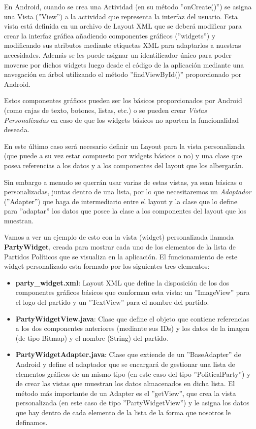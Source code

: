 		En Android, cuando se crea una Actividad (en su método ''onCreate()'') se asigna una Vista (''View'') a la actividad que representa la interfaz del usuario. Esta vista está definida en un archivo de Layout XML que se deberá modificar para crear la interfaz gráfica añadiendo componentes gráficos \cite{ref:android_widget} (''widgets'') y modificando sus atributos mediante etiquetas XML para adaptarlos a nuestras necesidades. Además se les puede asignar un identificador único para poder moverse por dichos widgets luego desde el código de la aplicación mediante una navegación en árbol utilizando el método ''findViewById()'' proporcionado por Android. 
		
		Estos componentes gráficos pueden ser los básicos proporcionados por Android (como cajas de texto, botones, listas, etc.) o se pueden crear \textit{Vistas Personalizadas} en caso de que los widgets básicos no aporten la funcionalidad deseada.
		
		En este último caso será necesario definir un Layout para la vista personalizada (que puede a su vez estar compuesto por widgets básicos o no) y una clase que posea referencias a los datos y a los componentes del layout que los albergarán.
		
		Sin embargo a menudo se querrán usar varias de estas vistas, ya sean básicas o personalizadas, juntas dentro de una lista,  por lo que necesitaremos un \textit{Adaptador}\cite{ref:android_adapter} (''Adapter'') que haga de intermediario entre el layout y la clase que lo define para ''adaptar'' los datos que posee la clase a los componentes del layout que los muestran. 
		
		Vamos a ver un ejemplo de esto con la vista (widget) personalizada llamada \textbf{PartyWidget}, creada para mostrar cada uno de los elementos de la lista de Partidos Políticos que se visualiza en la aplicación. El funcionamiento de este widget personalizado esta formado por los siguientes tres elementos:
		
		\begin{itemize}
			\item \textbf{party\_widget.xml}: Layout XML que define la disposición de los dos componentes gráficos básicos que conforman esta vista: un ''ImageView'' para el logo del partido y un ''TextView'' para el nombre del partido.
			\item \textbf{PartyWidgetView.java}: Clase que define el objeto que contiene referencias a los dos componentes anteriores (mediante sus IDs) y los datos de la imagen (de tipo Bitmap) y el nombre (String) del partido.
			\item \textbf{PartyWidgetAdapter.java}: Clase que extiende de un ''BaseAdapter'' de Android y define el adaptador que se encargará de gestionar una lista de elementos gráficos de un mismo tipo (en este caso del tipo ''PoliticalParty'') y de crear las vistas que muestran los datos almacenados en dicha lista. El método más importante de un Adapter es el ''getView'', que crea la vista personalizada (en este caso de tipo ''PartyWidgetView'') y le asigna los datos que hay dentro de cada elemento de la lista de la forma que nosotros le definamos. 
		\end{itemize}
		
